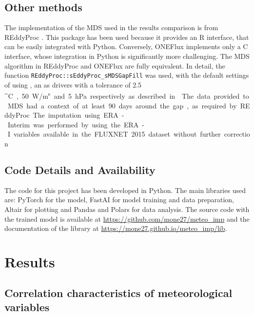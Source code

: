 \documentclass{article}
\let\Oldsection\section
\renewcommand{\section}{\FloatBarrier\Oldsection}
\let\Oldsubsection\subsection
\renewcommand{\subsection}{\FloatBarrier\Oldsubsection}
\begin{document}
\subsection{Other methods}

The implementation of the MDS used in the results comparison is from \textsf{REddyProc} \cite{wutzler_basic_2018}. This package has been used because it provides an R interface, that can be easily integrated with Python. Conversely, \textsf{ONEFlux} implements only a C interface, whose integration in Python is significantly more challenging.  The MDS algorithm in \textsf{REddyProc} and \textsf{ONEFlux} are fully equivalent. In detail, the function \verb|REddyProc::sEddyProc_sMDSGapFill| was used, with the default settings of using ,  an  as drivers with a tolerance of 2.5 \si{^\circ C}, 50 \si{W/m^s} and 5 \si{hPa} respectively as described in \textcite{reichstein_separation_2005-3}.
The data provided to MDS had a context of at least 90 days around the gap, as required by \textsf{REddyProc}.

The imputation using ERA-Interim was performed by using the ERA-I variables available in the FLUXNET 2015 dataset without further correction.

\subsection{Code Details and Availability}

The code for this project has been developed in Python. The main libraries used are: \textsf{PyTorch} \cite{NEURIPS2019_9015} for the model,  \textsf{FastAI} \cite{howard_fastai_2020} for model training and data preparation, \textsf{Altair} \cite{VanderPlas2018,Satyanarayan2017} for plotting and \textsf{Pandas} and \textsf{Polars} for data analysis. The source code with the trained model is available at \url{https://github.com/mone27/meteo_imp} and the documentation of the library at \url{https://mone27.github.io/meteo_imp/lib}.

\section{Results}

\subsection{Correlation characteristics of meteorological variables}
\end{document}

